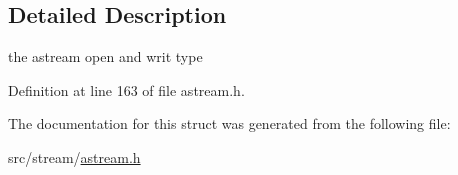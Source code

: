 \subsection{Detailed Description}
the astream open and writ type 

Definition at line 163 of file astream.\-h.



The documentation for this struct was generated from the following file\-:\begin{DoxyCompactItemize}
\item 
src/stream/\hyperlink{astream_8h}{astream.\-h}\end{DoxyCompactItemize}
